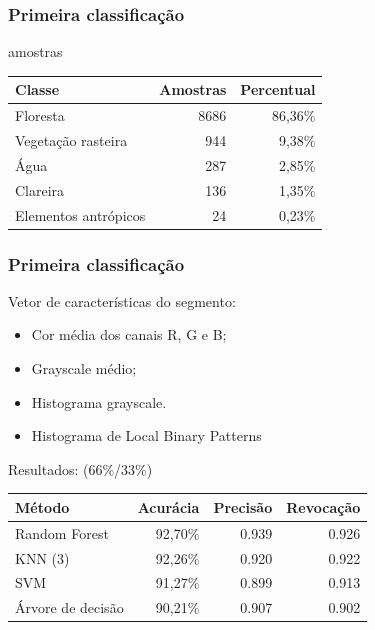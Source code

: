 \documentclass[t]{beamer}
\begin{document}
\begin{frame}
	\frametitle{Primeira classificação}

	 amostras

	\small{
	\begin{table}[h]
	\centering
	\begin{tabulary}{\linewidth}{|L|R|R|}
		\hline
		\textbf{Classe} & \textbf{Amostras} & \textbf{Percentual} \\ \hline
		Floresta             & 8686 & 86,36\% \\ \hline
		Vegetação rasteira   & 944  &  9,38\% \\ \hline
		Água                 & 287  &  2,85\% \\ \hline
		Clareira             & 136  &  1,35\% \\ \hline
		Elementos antrópicos & 24   &  0,23\% \\ \hline
	\end{tabulary}
	\end{table}
	}

\end{frame}


\begin{frame}
	\frametitle{Primeira classificação}

	Vetor de características do segmento:
	\begin{itemize}
		\item Cor média dos canais R, G e B;
 		\item Grayscale médio;
		\item Histograma grayscale.
		\item Histograma de Local Binary Patterns
	\end{itemize}

	Resultados: (66\%/33\%)
	\small{
	\begin{table}[h]
	\centering
	\begin{tabulary}{\linewidth}{|L|R|R|R|}
		\hline
		\textbf{Método} & \textbf{Acurácia} & \textbf{Precisão} & \textbf{Revocação} \\ \hline
		Random Forest     & 92,70\% & 0.939 & 0.926 \\ \hline
		KNN (3)           & 92,26\% & 0.920 & 0.922 \\ \hline
		SVM               & 91,27\% & 0.899 & 0.913 \\ \hline
		Árvore de decisão & 90,21\% & 0.907 & 0.902 \\ \hline
	\end{tabulary}
	\end{table}
	}

\end{frame}
\end{document}
